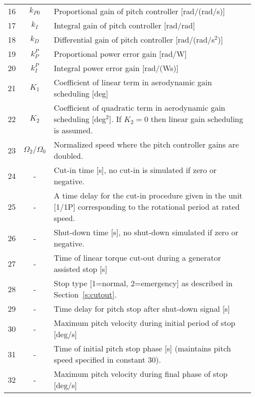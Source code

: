 \begin{table}[t]
\begin{center}
\begin{tabular}{r|c|p{11.5cm}}
16 & $k_{P0}$ 	& Proportional gain of pitch controller [rad/(rad/s)] \\
17 & $k_{I}$ 		& Integral gain of pitch controller [rad/rad]\\
18 & $k_{D}$ 		& Differential gain of pitch controller [rad/(rad/s$^2$)] \\
19 & $k_P^P$ 		& Proportional power error gain [rad/W] \\
20 & $k_I^P$ 		& Integral power error gain [rad/(Ws)] \\
21 & $K_1$ 			& Coefficient of linear term in aerodynamic gain scheduling [deg] \\
22 & $K_2$ 			& Coefficient of quadratic term in aerodynamic gain scheduling [deg$^2$]. If $K_2=0$ then linear gain scheduling is assumed. \\
23 & $\Omega_2/\Omega_0$ & Normalized speed where the pitch controller gains are doubled.\\
\hline
24 & - 			& Cut-in time [s], no cut-in is simulated if zero or negative. \\
25 & - 			& A time delay for the cut-in procedure given in the unit [1/1P] corresponding to the rotational period at rated speed.\\
26 & -  		& Shut-down time [s], no shut-down simulated if zero or negative. \\
27 & - 			& Time of linear torque cut-out during a generator assisted stop [s] \\
28 & - 			& Stop type [1=normal, 2=emergency] as described in Section~\ref{s:cutout}. \\
29 & -   		& Time delay for pitch stop after shut-down signal [s] \\
30 & - 			& Maximum pitch velocity during initial period of stop [deg/s] \\
31 & -  		& Time of initial pitch stop phase [s] (maintains pitch speed specified in constant 30).\\
32 & - 			& Maximum pitch velocity during final phase of stop [deg/s]
\end{tabular}
\end{center}
\end{table}

